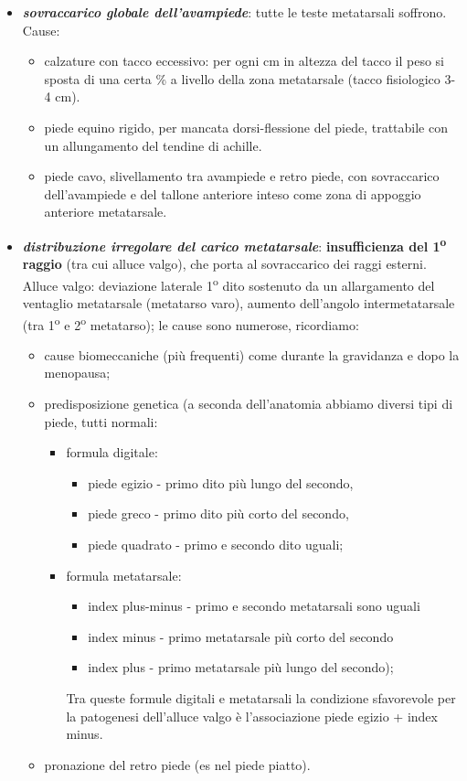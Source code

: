 \begin{itemize}
\item
  \textbf{\emph{sovraccarico globale dell'avampiede}}: tutte le teste metatarsali soffrono. Cause:
\begin{itemize}
\item
  calzature con tacco eccessivo: per ogni cm in altezza del tacco il peso si sposta di una certa \% a livello della zona metatarsale (tacco fisiologico 3-4 cm).
\item
  piede equino rigido, per mancata dorsi-flessione del piede, trattabile con un allungamento del tendine di achille.
\item
  piede cavo, slivellamento tra avampiede e retro piede, con sovraccarico dell'avampiede e del tallone anteriore inteso come zona di appoggio anteriore metatarsale.
\end{itemize}
\item
  \textbf{\emph{distribuzione irregolare del carico metatarsale}}: \textbf{insufficienza del 1\textsuperscript{o} raggio} (tra cui alluce valgo), che porta al sovraccarico dei raggi esterni. Alluce valgo: deviazione laterale 1\textsuperscript{o} dito sostenuto da un allargamento del ventaglio metatarsale (metatarso varo), aumento dell'angolo intermetatarsale (tra 1\textsuperscript{o} e 2\textsuperscript{o} metatarso); le cause sono numerose, ricordiamo:
\begin{itemize}
\item
  cause biomeccaniche (più frequenti) come durante la gravidanza e dopo la menopausa;
\item
  predisposizione genetica (a seconda dell'anatomia abbiamo diversi tipi di piede, tutti normali: 
\begin{itemize}
\item formula digitale: 
\begin{itemize}
\item piede egizio - primo dito più lungo del secondo,
\item piede greco - primo dito più corto del secondo,
\item piede quadrato - primo e secondo dito uguali;
\end{itemize}
\item formula metatarsale: 
\begin{itemize}
\item index plus-minus - primo e secondo metatarsali sono
uguali
\item index minus - primo metatarsale più corto del secondo
\item index plus - primo metatarsale più lungo del secondo);
\end{itemize}
Tra queste formule digitali e metatarsali la condizione sfavorevole per la patogenesi dell'alluce valgo è l'associazione piede egizio + index minus.
\end{itemize}
\item pronazione del retro piede (es nel piede piatto).
\end{itemize}


\end{itemize}
